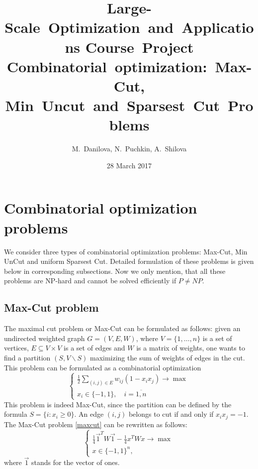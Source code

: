 \documentclass[12pt]{article}
\title{Large-Scale~Optimization~and~Applications Course~Project\\
Combinatorial~optimization:~Max-Cut, Min~Uncut~and~Sparsest~Cut~Problems}
\author{M.~Danilova, N.~Puchkin, A.~Shilova}
\date{28 March 2017}
\begin{document}
\maketitle

\section{Combinatorial optimization problems}

We consider three types of combinatorial optimization problems: Max-Cut, Min UnCut 
and uniform Sparsest Cut.
Detailed formulation of these problems is given below in corresponding subsections.
Now we only mention, that all these problems are NP-hard and cannot be solved 
efficiently if $P \neq NP$.



\subsection{Max-Cut problem}

The maximal cut problem or Max-Cut can be formulated as follows: given an undirected 
weighted graph $G = (V, E, W)$, where $V = \{1, \dots, n\}$ is a set of vertices, $E 
\subseteq V \times V$ is a set of edges and $W$ is a matrix of weights, one wants to find 
a partition $(S, V\backslash S)$ maximizing the sum of weights of edges in the cut.
This problem can be formulated as a combinatorial optimization
\begin{equation}
\label{maxcut}
	\begin{cases}
		\frac12 \sum\limits_{(i, j) \in E} w_{ij} ( 1 - x_i x_j ) \longrightarrow \max \\
		x_i \in \{ -1, 1 \}, \quad i = \overline{1, n}
	\end{cases}
\end{equation}
This problem is indeed Max-Cut, since the partition can be defined by the formula $S = 
\{ i : x_i \geq 0 \}$.
An edge $(i, j)$ belongs to cut if and only if $x_i x_j = -1$.
The Max-Cut problem \ref{maxcut} can be rewritten as follows:
\begin{equation}
\label{maxcut1}
	\begin{cases}
		\frac14 \vec 1^T W \vec 1 - \frac14 x^T W x \longrightarrow \max \\
		x \in \{-1, 1\}^n,
	\end{cases}
\end{equation}
where $\vec 1$ stands for the vector of ones.
\end{document}
